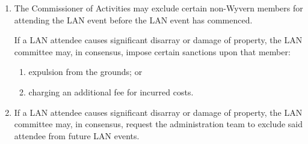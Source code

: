 \begin{enumerate}
    \item The Commissioner of Activities may exclude certain non-Wyvern members for attending the LAN event before the LAN event has commenced.
    
    \begin{item} If a LAN attendee causes significant disarray or damage of property, the LAN committee may, in consensus, impose certain sanctions upon that member:
        \begin{enumerate}
            \item expulsion from the grounds; or
            \item charging an additional fee for incurred costs.
        \end{enumerate}
    \end{item}
    
    \item If a LAN attendee causes significant disarray or damage of property, the LAN committee may, in consensus, request the administration team to exclude said attendee from future LAN events.

\end{enumerate}
\newpage